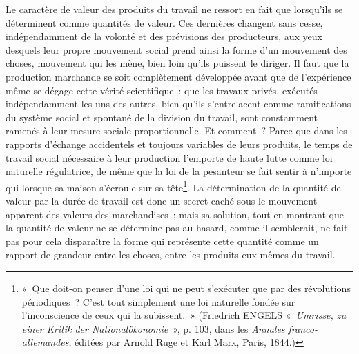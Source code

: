 \documentclass[french,twoside]{book} %
\begin{document}
Le caractère de valeur des produits du travail ne ressort en fait que lorsqu’ils se déterminent comme quantités de valeur. Ces dernières changent sans cesse, indépendamment de la volonté et des prévisions des producteurs, aux yeux desquels leur propre mouvement social prend ainsi la forme d’un mouvement des choses, mouvement qui les mène, bien loin qu’ils puissent le diriger. Il faut que la production marchande se soit complètement développée avant que de l’expérience même se dégage cette vérité scientifique : que les travaux privés, exécutés indépendamment les uns des autres, bien qu’ils s’entrelacent comme ramifications du système social et spontané de la division du travail, sont constamment ramenés à leur mesure sociale proportionnelle. Et comment ? Parce que dans les rapports d’échange accidentels et toujours variables de leurs produits, le temps de travail social nécessaire à leur production l’emporte de haute lutte comme loi naturelle régulatrice, de même que la loi de la pesanteur se fait sentir à n’importe qui lorsque sa maison s’écroule sur sa tête\footnote{« Que doit-on penser d’une loi qui ne peut s’exécuter que par des révolutions périodiques ? C’est tout simplement une loi naturelle fondée sur l’inconscience de ceux qui la subissent. » (Friedrich ENGELS « \emph{Umrisse, zu einer Kritik der Nationalökonomie} », p. 103, dans les \emph{Annales franco-allemandes}, éditées par Arnold Ruge et Karl Marx, Paris, 1844.)}. La détermination de la quantité de valeur par la durée de travail est donc un secret caché sous le mouvement apparent des valeurs des marchandises ; mais sa solution, tout en montrant que la quantité de valeur ne se détermine pas au hasard, comme il semblerait, ne fait pas pour cela disparaître la forme qui représente cette quantité comme un rapport de grandeur entre les choses, entre les produits eux-mêmes du travail.\par
\end{document}
